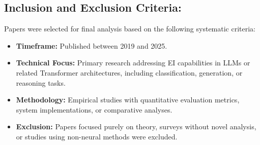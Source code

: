 \subsection{Inclusion and Exclusion Criteria:} 
Papers were selected for final analysis based on the following systematic criteria:
\begin{itemize}
    \item \textbf{Timeframe:} Published between 2019 and 2025.
    \item \textbf{Technical Focus:} Primary research addressing EI capabilities in LLMs or related Transformer architectures, including classification, generation, or reasoning tasks.
    \item \textbf{Methodology:} Empirical studies with quantitative evaluation metrics, system implementations, or comparative analyses.
    \item \textbf{Exclusion:} Papers focused purely on theory, surveys without novel analysis, or studies using non-neural methods were excluded.
\end{itemize}

